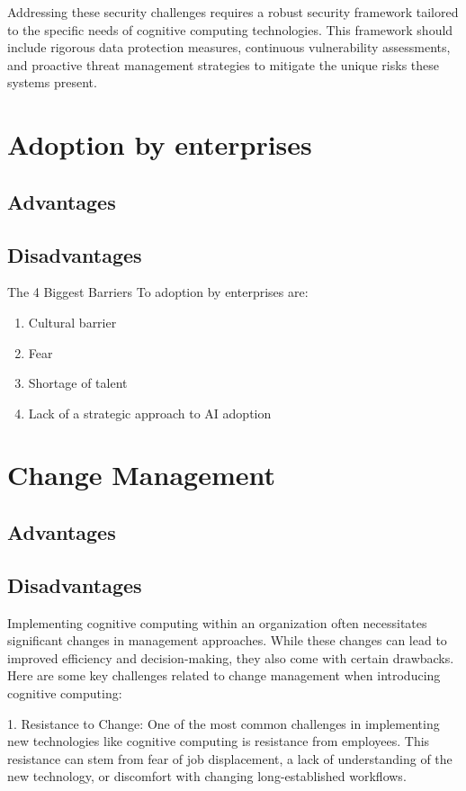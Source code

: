 \documentclass{article}
\begin{document}
Addressing these security challenges requires a robust security framework tailored to the specific needs of cognitive computing technologies. This framework should include rigorous data protection measures, continuous vulnerability assessments, and proactive threat management strategies to mitigate the unique risks these systems present.


\section{Adoption by enterprises}
\subsection{Advantages}

\subsection{Disadvantages}
The 4 Biggest Barriers To adoption by enterprises are:
\begin{enumerate}
	\item Cultural barrier 
	\item Fear
	\item Shortage of talent
	\item Lack of a strategic approach to AI adoption
\end{enumerate}


\section{Change Management}
\subsection{Advantages}

\subsection{Disadvantages}
Implementing cognitive computing within an organization often necessitates significant changes in management approaches. While these changes can lead to improved efficiency and decision-making, they also come with certain drawbacks. Here are some key challenges related to change management when introducing cognitive computing:

1. Resistance to Change: One of the most common challenges in implementing new technologies like cognitive computing is resistance from employees. This resistance can stem from fear of job displacement, a lack of understanding of the new technology, or discomfort with changing long-established workflows.
\end{document}
